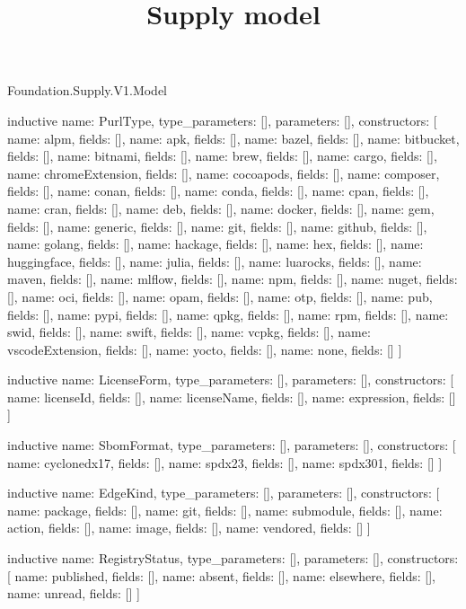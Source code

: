 \begin{lexlean}{Foundation.Supply.V1.Model}
\title{Supply model}
\begin{semanticmodule}
inductive{
  name: PurlType,
  type_parameters: [],
  parameters: [],
  constructors: [
    {name: alpm, fields: []},
    {name: apk, fields: []},
    {name: bazel, fields: []},
    {name: bitbucket, fields: []},
    {name: bitnami, fields: []},
    {name: brew, fields: []},
    {name: cargo, fields: []},
    {name: chromeExtension, fields: []},
    {name: cocoapods, fields: []},
    {name: composer, fields: []},
    {name: conan, fields: []},
    {name: conda, fields: []},
    {name: cpan, fields: []},
    {name: cran, fields: []},
    {name: deb, fields: []},
    {name: docker, fields: []},
    {name: gem, fields: []},
    {name: generic, fields: []},
    {name: git, fields: []},
    {name: github, fields: []},
    {name: golang, fields: []},
    {name: hackage, fields: []},
    {name: hex, fields: []},
    {name: huggingface, fields: []},
    {name: julia, fields: []},
    {name: luarocks, fields: []},
    {name: maven, fields: []},
    {name: mlflow, fields: []},
    {name: npm, fields: []},
    {name: nuget, fields: []},
    {name: oci, fields: []},
    {name: opam, fields: []},
    {name: otp, fields: []},
    {name: pub, fields: []},
    {name: pypi, fields: []},
    {name: qpkg, fields: []},
    {name: rpm, fields: []},
    {name: swid, fields: []},
    {name: swift, fields: []},
    {name: vcpkg, fields: []},
    {name: vscodeExtension, fields: []},
    {name: yocto, fields: []},
    {name: none, fields: []}
  ]
}

inductive{
  name: LicenseForm,
  type_parameters: [],
  parameters: [],
  constructors: [
    {name: licenseId, fields: []},
    {name: licenseName, fields: []},
    {name: expression, fields: []}
  ]
}

inductive{
  name: SbomFormat,
  type_parameters: [],
  parameters: [],
  constructors: [
    {name: cyclonedx17, fields: []},
    {name: spdx23, fields: []},
    {name: spdx301, fields: []}
  ]
}

inductive{
  name: EdgeKind,
  type_parameters: [],
  parameters: [],
  constructors: [
    {name: package, fields: []},
    {name: git, fields: []},
    {name: submodule, fields: []},
    {name: action, fields: []},
    {name: image, fields: []},
    {name: vendored, fields: []}
  ]
}

inductive{
  name: RegistryStatus,
  type_parameters: [],
  parameters: [],
  constructors: [
    {name: published, fields: []},
    {name: absent, fields: []},
    {name: elsewhere, fields: []},
    {name: unread, fields: []}
  ]
}


\end{semanticmodule}
\end{lexlean}
